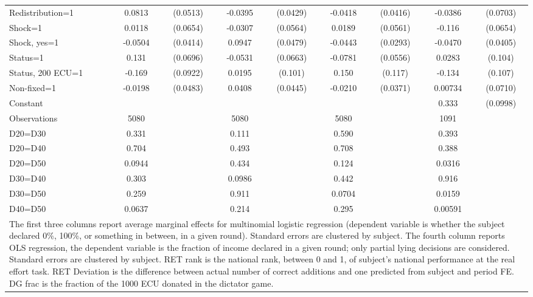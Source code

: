 \begin{tabular}{l|cccccc|cc}
Redistribution=1&   0.0813         & (0.0513)&  -0.0395         & (0.0429)&  -0.0418         & (0.0416)&  -0.0386         & (0.0703)\\
Shock=1         &   0.0118         & (0.0654)&  -0.0307         & (0.0564)&   0.0189         & (0.0561)&   -0.116\sym{*}  & (0.0654)\\
Shock, yes=1    &  -0.0504         & (0.0414)&   0.0947\sym{**} & (0.0479)&  -0.0443         & (0.0293)&  -0.0470         & (0.0405)\\
Status=1        &    0.131\sym{*}  & (0.0696)&  -0.0531         & (0.0663)&  -0.0781         & (0.0556)&   0.0283         &  (0.104)\\
Status, 200 ECU=1&   -0.169\sym{*}  & (0.0922)&   0.0195         &  (0.101)&    0.150         &  (0.117)&   -0.134         &  (0.107)\\
Non-fixed=1     &  -0.0198         & (0.0483)&   0.0408         & (0.0445)&  -0.0210         & (0.0371)&  0.00734         & (0.0710)\\
Constant        &                  &         &                  &         &                  &         &    0.333\sym{***}& (0.0998)\\
\hline
Observations    &     5080         &         &     5080         &         &     5080         &         &     1091         &         \\
D20=D30         &    0.331         &         &    0.111         &         &    0.590         &         &    0.393         &         \\
D20=D40         &    0.704         &         &    0.493         &         &    0.708         &         &    0.388         &         \\
D20=D50         &   0.0944         &         &    0.434         &         &    0.124         &         &   0.0316         &         \\
D30=D40         &    0.303         &         &   0.0986         &         &    0.442         &         &    0.916         &         \\
D30=D50         &    0.259         &         &    0.911         &         &   0.0704         &         &   0.0159         &         \\
D40=D50         &   0.0637         &         &    0.214         &         &    0.295         &         &  0.00591         &         \\
\hline\hline
\multicolumn{9}{p{16cm}}{\tiny The first three columns report average marginal effects for multinomial logistic regression (dependent variable is whether the subject declared 0\%, 100\%, or something in between, in a given round). Standard errors are clustered by subject. The fourth column reports OLS regression, the dependent variable is the fraction of income declared in a given round; only partial lying decisions are considered. Standard errors are clustered by subject. RET rank is the national rank, between 0 and 1, of subject's national performance at the real effort task. RET Deviation is the difference between actual number of correct additions and one predicted from subject and period FE. DG frac is the fraction of the 1000 ECU donated in the dictator game.}\\

\end{tabular}
